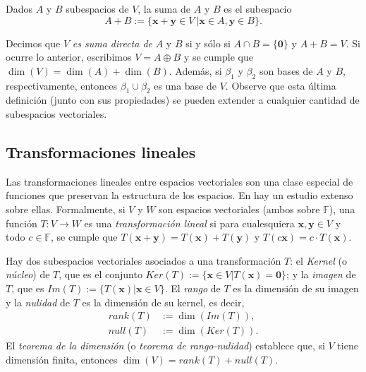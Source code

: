             Dados $A$ y $B$ subespacios de $ V$, la suma  de $A$ y $B$ es el subespacio $$A+B := \{ \mathbf{x + y} \in V\ | \mathbf{x}\in A, \mathbf{y} \in B \}.$$
            
            Decimos que $V$ \textit{es suma directa de} $A$ y $B$ si y sólo si $A \cap B= \{\mathbf{0}\}$ y $A+B = V$. Si ocurre lo anterior, escribimos $V = A \oplus B$ y se cumple que $\dim(V) = \dim(A) + \dim(B)$. Además, si $\beta_{1}$ y $\beta_{2}$ son bases de $A$ y $B$, respectivamente, entonces $\beta_{1} \cup \beta_{2}$  es una base de $V$. Observe que esta última definición (junto con sus propiedades) se pueden extender a cualquier cantidad de subespacios vectoriales. 
            
        \subsection{Transformaciones lineales}
            Las transformaciones lineales entre espacios vectoriales son una clase especial de funciones que preservan la estructura de los espacios. En \cite{Friedberg} hay un estudio extenso sobre ellas. Formalmente, si $V$ y $W$ son espacios vectoriales (ambos  sobre $\mathbb{F}$), una función $T : V \rightarrow W$ es una \textit{transformación lineal} si para cualesquiera $\mathbf{x,y} \in V$ y todo $ c \in \mathbb{F}$, se cumple que $T(\mathbf{x + y}) = T(\mathbf{x}) + T(\mathbf{y})$ y $T(c\mathbf{x}) = c\cdot T(\mathbf{x})$.


            Hay dos subespacios vectoriales asociados a una transformación $T$: el \textit{Kernel} (o \textit{núcleo}) de $T$, que es el conjunto $Ker(T):= \{ \mathbf{x} \in V | T(\mathbf{x}) = \mathbf{0}\}$; y la \textit{imagen}  de $T$, que es $Im(T):= \{ T(\mathbf{x}) | \mathbf{x} \in V\}$. El \textit{rango} de $T$  es la dimensión de su imagen y la \textit{nulidad}  de $T$ es la dimensión de su kernel, es decir,
                \begin{align*}
                rank(T)&:= \dim(Im(T)),\\ 
                null(T)&:= \dim(Ker(T)).
                \end{align*}
            El \textit{teorema de la dimensión} (o \textit{teorema de rango-nulidad}) establece que, si $V$ tiene dimensión finita, entonces $\dim(V)= rank(T) + null(T)$.

